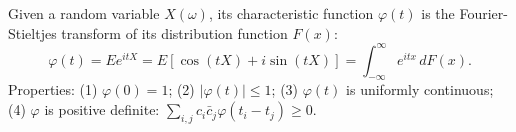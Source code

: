 Given a random variable $X(\omega)$, its characteristic function $\varphi(t)$ is the Fourier-Stieltjes transform of its distribution function $F(x)$:
$$\varphi(t) = E e^{itX} = E[\cos(tX) + i \sin(tX)] = \int_{-\infty}^{\infty} e^{itx} \, dF(x).$$
Properties: (1) $\varphi(0) = 1$; (2) $|\varphi(t)| \leq 1$; (3) $\varphi(t)$ is uniformly continuous; (4) $\varphi$ is positive definite: $\sum_{i,j} c_i \bar{c}_j \varphi(t_i - t_j) \geq 0$.
